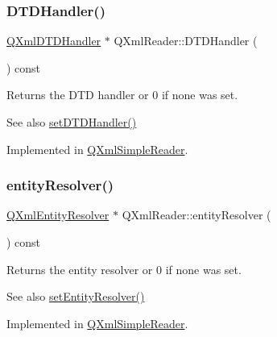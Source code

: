 \subsubsection{\texorpdfstring{DTDHandler()}{DTDHandler()}}
{\footnotesize\ttfamily \mbox{\hyperlink{class_q_xml_d_t_d_handler}{Q\+Xml\+D\+T\+D\+Handler}} $\ast$ Q\+Xml\+Reader\+::\+D\+T\+D\+Handler (\begin{DoxyParamCaption}{ }\end{DoxyParamCaption}) const\hspace{0.3cm}{\ttfamily [pure virtual]}}

Returns the D\+TD handler or 0 if none was set.

\begin{DoxySeeAlso}{See also}
\mbox{\hyperlink{class_q_xml_reader_a0b24b1fe26a4c32a8032d68ee14d5dba}{set\+D\+T\+D\+Handler()}} 
\end{DoxySeeAlso}


Implemented in \mbox{\hyperlink{class_q_xml_simple_reader_ad75f6836c8472e6951ae83341439e89e}{Q\+Xml\+Simple\+Reader}}.

\mbox{\label{class_q_xml_reader_ad16d14b4da2560aa3f32ea754d8d1104}} 
\subsubsection{\texorpdfstring{entityResolver()}{entityResolver()}}
{\footnotesize\ttfamily \mbox{\hyperlink{class_q_xml_entity_resolver}{Q\+Xml\+Entity\+Resolver}} $\ast$ Q\+Xml\+Reader\+::entity\+Resolver (\begin{DoxyParamCaption}{ }\end{DoxyParamCaption}) const\hspace{0.3cm}{\ttfamily [pure virtual]}}

Returns the entity resolver or 0 if none was set.

\begin{DoxySeeAlso}{See also}
\mbox{\hyperlink{class_q_xml_reader_a82a810f10ac48cf35d698f57bc2d4647}{set\+Entity\+Resolver()}} 
\end{DoxySeeAlso}


Implemented in \mbox{\hyperlink{class_q_xml_simple_reader_a7e754b5b6fc96a4fd477de791c317317}{Q\+Xml\+Simple\+Reader}}.

\mbox{\label{class_q_xml_reader_aa347587bcc9e8b109aed2c5a41687901}} 
